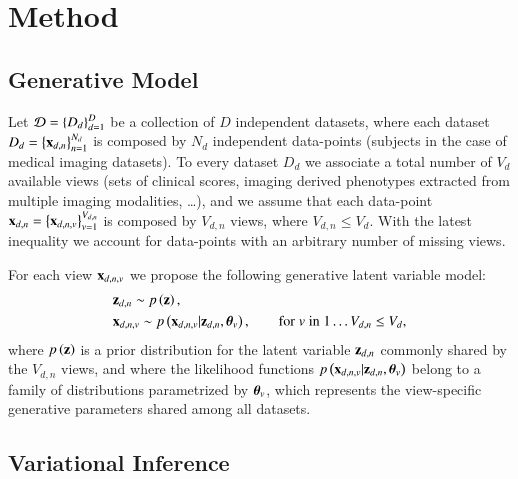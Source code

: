 \section{Method}

\subsection{Generative Model}
Let $\mathcal{D} = \left\{D_d\right\}_{d=1}^D$ be a collection of $D$ independent datasets, where each dataset $D_d = \left\{\mathbf{x}_{d,n}\right\}_{n=1}^{N_d}$ is composed by $N_d$ independent data-points (\eg subjects in the case of medical imaging datasets).
To every dataset $D_d$ we associate a total number of $V_d$ available views
(\eg sets of clinical scores, imaging derived phenotypes extracted from multiple imaging modalities, \ldots),
and we assume that each data-point $\mathbf{x}_{d,n} = \left\{\mathbf{x}_{d,n,v}\right\}_{v=1}^{V_{d,n}}$ is composed by $V_{d,n}$ views,
where $V_{d,n} \leq V_d$.
With the latest inequality we account for data-points with an arbitrary number of missing views.

For each view $\mathbf{x}_{d,n,v}$ we propose the following generative latent variable model:
\begin{equation}\label{eq:model}
\begin{aligned}
&\z_{d,n} \sim \p{\z}, \\  %
&\xdnv \sim \p{\xdnv|\z_{d,n},\thetab_v},  %
\qquad \textnormal {for} \; v \; \textnormal{in} \; 1 \ldots V_{d,n} \leq V_d,
\end{aligned}
\end{equation}
where $p\left(\mathbf{z}\right)$ is a prior distribution for the latent variable $\mathbf{z}_{d,n}$ commonly shared by the $V_{d,n}$ views, and
where the likelihood functions $p\left(\mathbf{x}_{d,n,v}|\mathbf{z}_{d,n},\boldsymbol{\theta}_v\right)$ belong to a family of distributions parametrized by $\boldsymbol{\theta}_v$, which represents the view-specific generative parameters shared among all datasets.

\subsection{Variational Inference}

